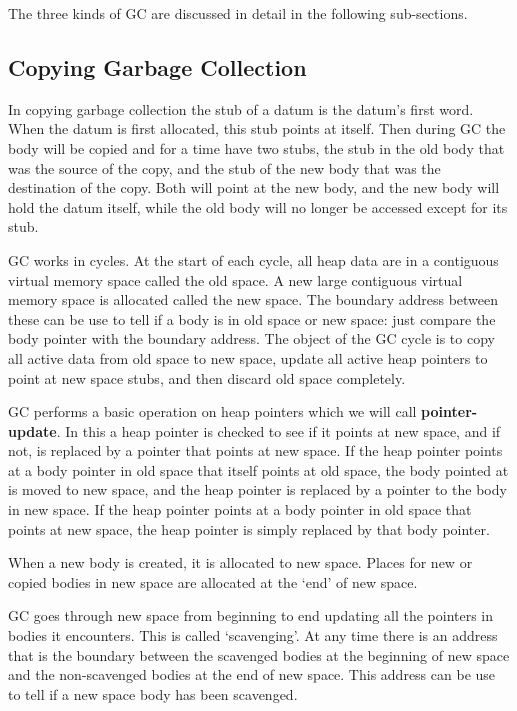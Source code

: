 \documentclass[12pt]{article}
\newcommand{\key}[1]{{\rm \bfseries #1}}
\begin{document}
The three kinds of GC are discussed in detail in the following sub-sections.


\subsection{Copying Garbage Collection}
\label{COPYING-GARBAGE-COLLECTION}

In copying garbage collection the stub of a datum is the datum's
first word.  When the datum is first allocated, this
stub points at itself.  Then during GC the body will be
copied and for a time have two stubs, the stub in the old
body that was the source of the copy, and the stub of the
new body that was the destination of the copy.  Both will
point at the new body, and the new body will hold the
datum itself, while the old body will no longer be accessed
except for its stub.

GC works in cycles.  At the start of each cycle, all heap
data are in a contiguous virtual memory space called the
old space.  A new large contiguous virtual memory space
is allocated called the new space.  The boundary address
between these can be use to tell if a body is in old space
or new space: just compare the body pointer with the boundary
address.  The object of the GC cycle is to copy all active
data from old space to new space, update all active heap pointers
to point at new space stubs, and then discard old space
completely.

GC performs a basic operation on heap pointers which
we will call \key{pointer-update}.  In this a heap pointer is
checked to see if it points at new space, and if not,
is replaced by a pointer that points at new space.
If the heap pointer points at a body pointer in old space
that itself points at old space, the body pointed at is
moved to new space, and the heap pointer is replaced by
a pointer to the body in new space.  If the heap pointer
points at a body pointer in old space that points at new space, the
heap pointer is simply replaced by that body pointer.

When a new body is created, it is allocated to new space.
Places for new or copied bodies in new space are
allocated at the `end' of new space.

GC goes through new space from beginning to end updating
all the pointers in bodies it encounters.  This is called
`scavenging'.  At any time there is an address that is the
boundary between the scavenged bodies at the beginning
of new space and the non-scavenged bodies at the end of
new space.  This address can be use to tell if a new space
body has been scavenged.
\end{document}
